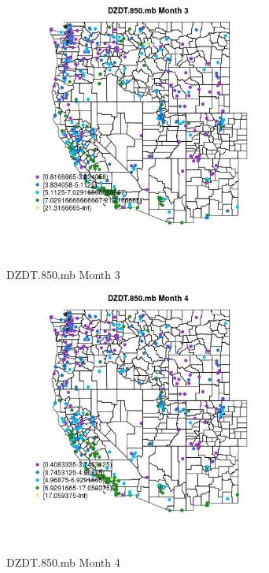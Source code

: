 \begin{figure} 
\centering  
\includegraphics[width=0.77\textwidth]{Code_Outputs/ML_input_report_ML_input_PM25_Step5_part_d_de_duplicated_aves_ML_input_MapObsMo3DZDT850mb.jpg} 
\caption{\label{fig:ML_input_report_ML_input_PM25_Step5_part_d_de_duplicated_aves_ML_inputMapObsMo3DZDT850mb}DZDT.850.mb Month 3} 
\end{figure} 
 

\begin{figure} 
\centering  
\includegraphics[width=0.77\textwidth]{Code_Outputs/ML_input_report_ML_input_PM25_Step5_part_d_de_duplicated_aves_ML_input_MapObsMo4DZDT850mb.jpg} 
\caption{\label{fig:ML_input_report_ML_input_PM25_Step5_part_d_de_duplicated_aves_ML_inputMapObsMo4DZDT850mb}DZDT.850.mb Month 4} 
\end{figure} 
 

